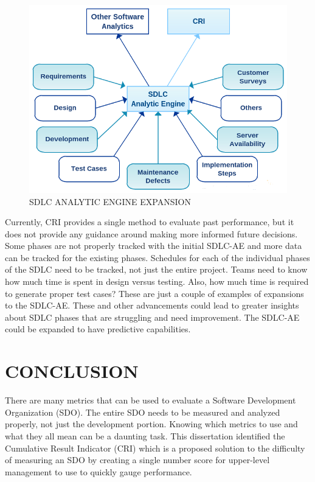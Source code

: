 \documentclass[SDSUThesis.tex]{subfiles}
\begin{document}
    \begin{figure}[ht]
    \includegraphics[scale=.75]{images/sdlcae-adv.png}
    \caption{SDLC ANALYTIC ENGINE EXPANSION}
    \label{fig:sdlc-ae-adv}
    \end{figure}
    
    Currently, CRI provides a single method to evaluate past 
    performance, but it does not
    provide any guidance around making more informed future decisions. 
    Some phases are not properly tracked with the initial SDLC-AE and more
    data can be tracked for the existing phases.
    Schedules for each of the individual phases of the SDLC need to be tracked,
    not just the entire project.  Teams need to know how much time is spent
    in design versus testing.  Also, how much time is required to generate
    proper test cases?  These are just a couple of examples of expansions
    to the SDLC-AE.  These and other advancements could lead to greater
    insights about SDLC phases that are struggling and need improvement.
    The SDLC-AE could be expanded to have predictive capabilities.


\section{CONCLUSION}

    There are many metrics that can be used to evaluate a Software
    Development Organization (SDO). The entire SDO needs to be measured 
    and analyzed properly, not just the development portion. 
    Knowing which metrics to use and what they all mean can be a daunting task.  
    This dissertation identified the Cumulative Result Indicator (CRI) which is a
    proposed solution to the difficulty of measuring an SDO by creating a
    single number score for upper-level management to use to quickly gauge
    performance. 
    
\end{document}

